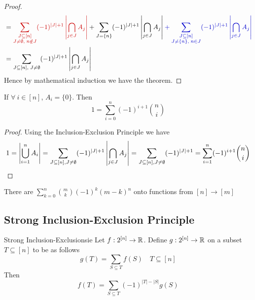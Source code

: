 \begin{proof}
\begin{align*}
		                                    &= \mathcolor{red!80!black}{ \sum_{\substack{J\subseteq [n]\\J\neq\emptyset,\; n\notin J}}(-1)^{|J|+1}\lt|\bigcap_{j\in J}A_j\rt|       }   +\sum_{J=\{n\}}(-1)^{|J|+1}\lt|\bigcap_{j\in J} A_j \rt|       \mathcolor{blue!80!black}{+\sum_{\substack{J\subseteq[n]\\ J\neq\{n\},\; n\in J}} (-1)^{|J|+1}\lt|\bigcap_{j\in J}A_j\rt|}\\
		                                    &= \sum_{J\subseteq [n],\; J\neq\emptyset}(-1)^{|J|+1}\lt|\bigcap_{j\in J}A_j\rt|
	\end{align*}
Hence by mathematical induction we have the theorem.
\end{proof}
\begin{corollary}{}{}
	If $\forall\ i\in[n]$, $A_i=\{0\}$. Then $$1=\sum_{i=0}^n(-1)^{i+1}\binom{n}{i}$$
\end{corollary}
\begin{proof}
	Using the Inclusion-Exclusion Principle we have $$1=\left|\bigcup_{i=1}^nA_i\right|=\sum_{J\subseteq [n], J\neq\emptyset}(-1)^{|J|+1}\left|\bigcap_{j\in J}A_j\right|=\sum_{J\subseteq [n], J\neq\emptyset}(-1)^{|J|+1}=\sum_{i=1}^n(-1)^{i+1}\binom{n}{i}$$
\end{proof}
\begin{corolary}{}{}
	There are $\sum\limits_{k=0}^n\binom{m}{k}(-1)^k(m-k)^n$ onto functions from $[n]\to [m]$
\end{corolary}
\subsection{Strong Inclusion-Exclusion Principle}
\begin{Theorem}{Strong Inclusion-Exclusion}{sie}
	Let $f:2^{[n]}\to \mathbb{R}$. Define $g:2^{[n]}\to \mathbb{R}$ on a subset $T\subseteq [n]$ to be as follows $$g(T)=\sum_{S\subseteq T}f(S)\quad T\subseteq [n]$$Then $$f(T)=\sum_{S\subseteq T}(-1)^{|T|-|S|}g(S)$$
\end{Theorem}
